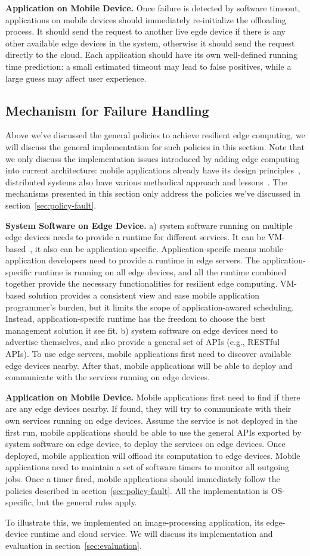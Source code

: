 \noindent \textbf{Application on Mobile Device.}
Once failure is detected by software timeout, applications on mobile
devices should immediately re-initialize the offloading process. It should send the request
to another live egde device if there is any other available edge devices in the system, otherwise
it should send the request directly to the cloud. Each application should have its own well-defined
running time prediction: a small estimated timeout may lead to false positives, while a large
guess may affect user experience.

\subsection{Mechanism for Failure Handling}
Above we've discussed the general policies to achieve resilient edge computing, we will discuss
the general implementation for such policies in this section. Note that we only discuss the
implementation issues introduced by adding edge computing into current architecture:
mobile applications already have its design principles~\cite{mobi-comp-principle}, distributed systems
also have various methodical approach and lessons~\cite{cavage-queue13,google-acm16}. The mechanisms
presented in this section only address the policies we've discussed in section~\ref{sec:policy-fault}.

\hfill\break
\noindent \textbf{System Software on Edge Device.}
a) system software running on multiple edge devices needs to provide a runtime for different services.
It can be VM-based~\cite{cloudlets09}, it also can be application-specific. Application-specifc means
mobile application developers need to provide a runtime in edge servers. The application-specific runtime is
running on all edge devices, and all the runtime combined together provide the necessary functionalities
for resilient edge computing. VM-based solution provides a consistent view and ease mobile application programmer's burden,
but it limits the scope of application-awared scheduling. Instead, application-specifc runtime has the freedom
to choose the best management solution it see fit.
b) system software on edge devices need to advertise themselves, and also provide a general set of APIs (e.g., RESTful APIs).
To use edge servers, mobile applications first need to discover available edge devices nearby. After that, mobile applications
will be able to deploy and communicate with the services running on edge devices.

\noindent \textbf{Application on Mobile Device.}
Mobile applications first need to find if there are any edge devices nearby. If found, they will try to communicate with
their own services running on edge devices. Assume the service is not deployed in the first run, mobile applications should
be able to use the general APIs exported by system software on edge device, to deploy the services on edge devices.
Once deployed, mobile application will offload its computation to edge devices. Mobile applications need to maintain a
set of software timers to monitor all outgoing jobs. Once a timer fired, mobile applications should immediately follow the
policies described in section~\ref{sec:policy-fault}. All the implementation is OS-specific, but the general rules apply.

To illustrate this, we implemented an image-processing application, its edge-device runtime and cloud service.
We will discuss its implementation and evaluation in section~\ref{sec:evaluation}.
